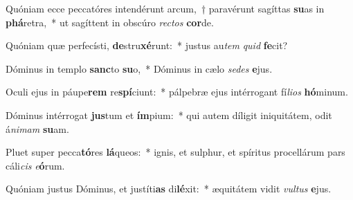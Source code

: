 \item Quóniam ecce peccatóres intendérunt arcum,~† paravérunt sagíttas \textbf{su}as in \textbf{phá}retra,~* ut sagíttent in obscúro \textit{rec}\textit{tos} \textbf{cor}de.
\item Quóniam quæ perfecísti, \textbf{de}stru\textbf{xé}runt:~* justus au\textit{tem} \textit{quid} \textbf{fe}cit?
\item Dóminus in templo \textbf{sanc}to \textbf{su}o,~* Dóminus in cælo \textit{se}\textit{des} \textbf{e}jus.
\item Oculi ejus in páupe\textbf{rem} re\textbf{spí}ciunt:~* pálpebræ ejus intérrogant fí\textit{li}\textit{os} \textbf{hó}minum.
\item Dóminus intérrogat \textbf{jus}tum et \textbf{ím}pium:~* qui autem díligit iniquitátem, odit á\textit{ni}\textit{mam} \textbf{su}am.
\item Pluet super pecca\textbf{tó}res \textbf{lá}queos:~* ignis, et sulphur, et spíritus procellárum pars cáli\textit{cis} \textit{e}\textbf{ó}rum.
\item Quóniam justus Dóminus, et justíti\textbf{as} di\textbf{lé}xit:~* æquitátem vidit \textit{vul}\textit{tus} \textbf{e}jus.
